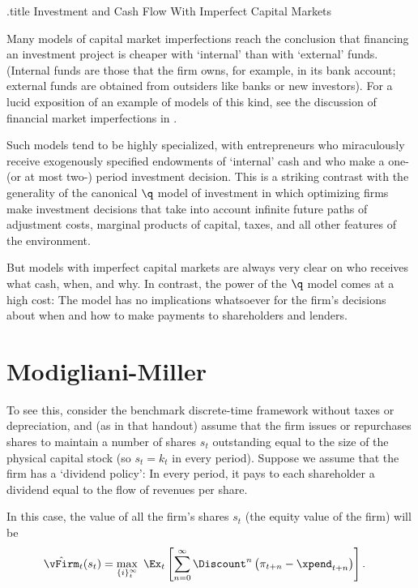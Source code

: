 \documentclass{handout}
\begin{document}
\handoutHeader

\begin{verbatimwrite}{\jobname.title}
Investment and Cash Flow With Imperfect Capital Markets
\end{verbatimwrite}

\handoutNameMake

Many models of capital market imperfections reach the conclusion that
financing an investment project is cheaper with `internal' than
with `external' funds.  (Internal funds are those that the firm owns, for
example, in its bank account; external funds are obtained from
outsiders like banks or new investors).  For a lucid exposition of an example
of models of this kind, see the discussion of financial market imperfections
in \cite{romer:text}.

Such models tend to be highly specialized, with entrepreneurs who
miraculously receive exogenously specified endowments of `internal'
cash and who make a one- (or at most two-) period investment decision.  This is a
striking contrast with the generality of the canonical $\q$ model of
investment in which optimizing firms make investment decisions that
take into account infinite future paths of adjustment costs, marginal
products of capital, taxes, and all other features of the environment.

But models with imperfect capital markets are always
very clear on who receives what cash, when, and why.
In contrast, the power of the $\q$ model comes at a high cost: The 
model has no implications whatsoever for the firm's decisions
about when and how to make payments to shareholders and lenders.

\section{Modigliani-Miller}
To see this, consider the benchmark discrete-time framework
 without taxes or depreciation, and (as in that
handout) assume that the firm issues or repurchases shares to maintain
a number of shares $s_{t}$ outstanding equal to the size of the
physical capital stock (so $s_{t}=k_{t}$ in every period).  Suppose we
assume that the firm has a `dividend policy': In every period, it pays
to each shareholder a dividend equal to the flow of revenues per
share.

In this case, the value of all the firm's shares $s_{t}$ (the equity value
of the firm) will be
\begin{equation}\begin{gathered}\begin{aligned}
  \hat{\vFirm}_{t}(s_{t}) & =  \max_{\{i\}_{t}^{\infty}}~\Ex_{t}\left[\sum_{n=0}^{\infty} \Discount^{n} \left(\pi_{t+n}-\xpend_{t+n}\right)\right].
\end{aligned}\end{gathered}\end{equation}
\end{document}
